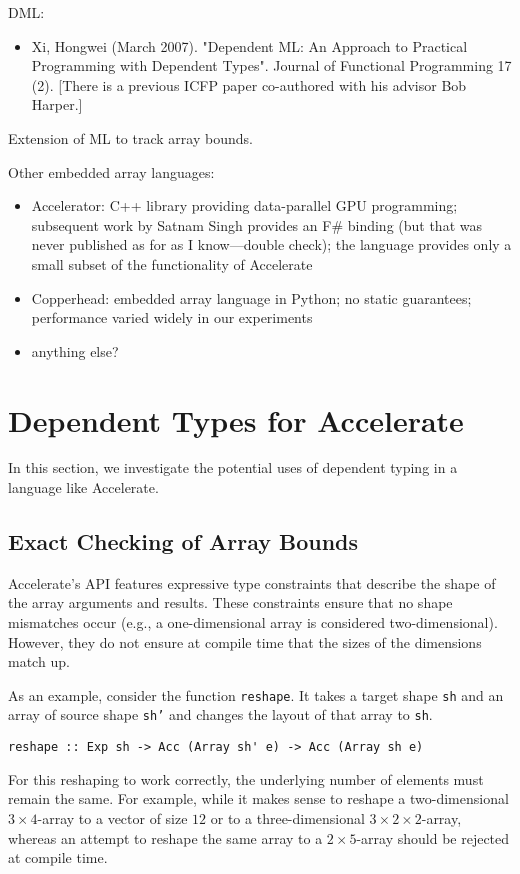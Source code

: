 \documentclass{llncs}
\begin{document}
DML:
\begin{itemize}
\item Xi, Hongwei (March 2007). "Dependent ML: An Approach to Practical Programming with Dependent Types". Journal of Functional Programming 17 (2). [There is a previous ICFP paper co-authored with his advisor Bob Harper.]
\end{itemize}
Extension of ML to track array bounds.

Other embedded array languages:
\begin{itemize}
\item Accelerator: C++ library providing data-parallel GPU programming; subsequent work by Satnam Singh provides an F\# binding (but that was never published as for as I know---double check); the language provides only a small subset of the functionality of Accelerate
\item Copperhead: embedded array language in Python; no static guarantees; performance varied widely in our experiments
\item anything else?
\end{itemize}


\section{Dependent Types for Accelerate}
\label{sec:dependent-types}

In this section, we investigate the potential uses of dependent typing
in a language like Accelerate.

\subsection{Exact Checking of Array Bounds}
\label{sec:exact-checking-array}

Accelerate's API features expressive type constraints that describe
the shape of the array arguments and results. These constraints ensure
that no shape mismatches occur (e.g., a one-dimensional array is
considered two-dimensional). However, they do not ensure at compile
time that the sizes of the dimensions match up.

As an example, consider the function \texttt{reshape}. 
It takes a target shape \texttt{sh} and an array of source shape
\texttt{sh'} and changes the layout of that array to \texttt{sh}. 
\begin{verbatim}
reshape :: Exp sh -> Acc (Array sh' e) -> Acc (Array sh e)
\end{verbatim}
For this reshaping to work correctly, the underlying
number of elements must remain the same. For example, while it makes sense
to reshape a two-dimensional $3\times 4$-array  to a vector of size
$12$ or to a three-dimensional $3\times2\times2$-array, whereas an attempt to
reshape the same array to a $2\times5$-array should be rejected at
compile time.
\end{document}
